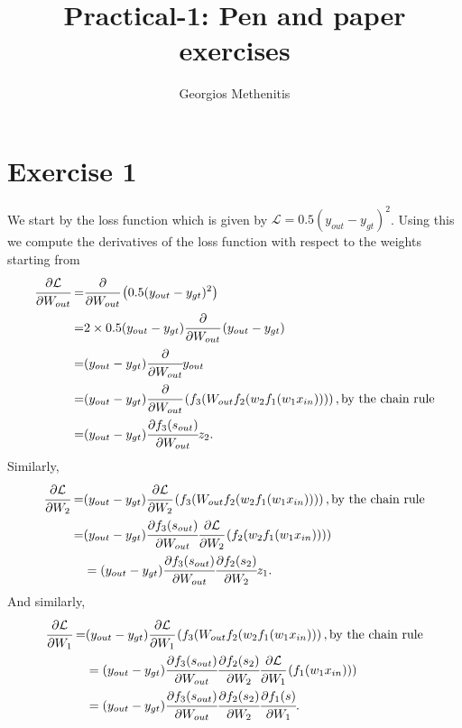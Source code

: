 \documentclass[10pt]{article}
\title{Practical-1: Pen and paper exercises}
\author{Georgios Methenitis}
\begin{document}
\maketitle


\section*{Exercise 1}

We start by the loss function which is given by $\mathcal{L} = 0.5 (y_{out} - y_{gt})^2$.
Using this we compute the derivatives of the loss function with respect to the weights starting from
\begin{align*}
\cfrac{\partial \mathcal{L}}{\partial W_{out}} =& \cfrac{\partial}{\partial W_{out}} \left( 0.5 (y_{out} - y_{gt})^2 \right)\\
=& 2 \times 0.5 (y_{out} - y_{gt}) \cfrac{\partial}{\partial W_{out}} \left( y_{out} - y_{gt} \right)\\
=& (y_{out} - y_{gt}) \cfrac{\partial}{\partial W_{out}}y_{out}\\
=& (y_{out} - y_{gt}) \cfrac{\partial}{\partial W_{out}} \left( f_3 ( W_{out} f_2(w_2 f_1 (w_1 x_{in}))) \right), \text{by the chain rule}\\
=& (y_{out} - y_{gt}) \cfrac{\partial f_3 (s_{out})}{\partial W_{out}} z_2.
\end{align*}
Similarly,
\begin{align*}
\cfrac{\partial \mathcal{L}}{\partial W_2} =& (y_{out} - y_{gt})  \cfrac{\partial \mathcal{L}}{\partial W_2} \left( f_3 ( W_{out} f_2(w_2 f_1 (w_1 x_{in}))) \right), \text{by the chain rule}\\
=&  (y_{out} - y_{gt}) \cfrac{\partial f_3 (s_{out})}{\partial W_{out}} \cfrac{\partial \mathcal{L}}{\partial W_2} \left( f_2(w_2 f_1 (w_1 x_{in}))) \right)\\
&= (y_{out} - y_{gt}) \cfrac{\partial f_3 (s_{out})}{\partial W_{out}} \cfrac{\partial f_2 (s_2)}{\partial W_2} z_1.
\end{align*}
And similarly,
\begin{align*}
\cfrac{\partial \mathcal{L}}{\partial W_1} =& (y_{out} - y_{gt})  \cfrac{\partial \mathcal{L}}{\partial W_1} \left( f_3 ( W_{out} f_2(w_2 f_1 (w_1 x_{in})) \right), \text{by the chain rule}\\
&= (y_{out} - y_{gt}) \cfrac{\partial f_3 (s_{out})}{\partial W_{out}} \cfrac{\partial f_2 (s_2)}{\partial W_2} \cfrac{\partial \mathcal{L}}{\partial W_1} \left(f_1 (w_1 x_{in})) \right)\\
&= (y_{out} - y_{gt}) \cfrac{\partial f_3 (s_{out})}{\partial W_{out}} \cfrac{\partial f_2 (s_2)}{\partial W_2} \cfrac{\partial f_1 (s)}{\partial W_1}.
\end{align*}
\end{document}
